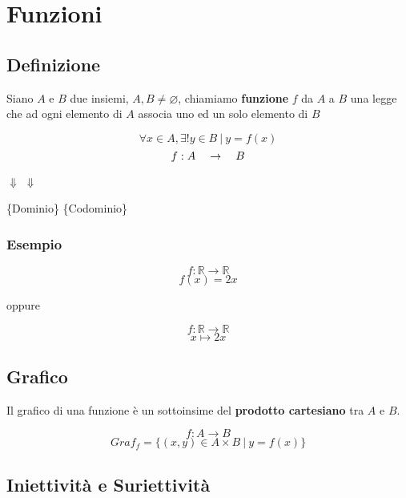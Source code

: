 \section{Funzioni}
\subsection{Definizione}
Siano $A$ e $B$ due insiemi, $A,B \neq \varnothing$, chiamiamo \textbf{funzione} $f$ da $A$ a $B$
una legge che ad ogni elemento di $A$ associa uno ed un solo elemento di $B$
\begin{Large}
\[
    \forall x \in A, \exists! y \in B\ |\ y = f(x)    
\]
\vspace{-1em}
\[
    f: A \text{\quad} \rightarrow \text{\quad} B
\]
\end{Large}
\vspace{-6.5ex}
\begin{center}
    \hspace{2em}$\Downarrow$ \hspace{5em} $\Downarrow$\\
    \begin{small}
    \qquad \{Dominio\} \quad \{Codominio\}
    \end{small}
\end{center}
\subsubsection*{Esempio}
\begin{Large}
\[
    f: \mathbb{R} \rightarrow \mathbb{R}    
\]
\[
    f(x) = 2x    
\]
\end{Large}
oppure
\begin{Large}
\[
    f: \mathbb{R} \rightarrow \mathbb{R}
\]
\[
    x \mapsto 2x
\]
\end{Large}

\subsection{Grafico}
Il grafico di una funzione è un sottoinsime del \textbf{prodotto cartesiano} tra $A$ e $B$.
\begin{Large}
\[
    f:A \rightarrow B
\]
\[
    Graf_{f}= \{(x,y) \in A \times B\ |\ y=f(x)\}
\]
\end{Large}
\subsection{Iniettività e Suriettività}
